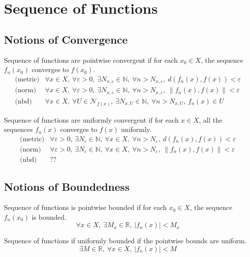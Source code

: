 \section{Sequence of Functions}
\subsection{Notions of Convergence}
\begin{definition}[pointwise]
	Sequence of functions are pointwise convergent if for each $x_0 \in X$, the sequence $f_n(x_0)$ converges to $f(x_0)$.
\begin{eqnarray}
	\text{(metric)} & \forall x \in X,\ \forall \varepsilon > 0,\ \exists N_{x,\varepsilon} \in \mathbb{N},\ \forall n > N_{x,\varepsilon},\ d(f_n(x),f(x)) < \varepsilon \\
	\text{(norm)} & \forall x \in X,\ \forall \varepsilon > 0,\ \exists N_{x,\varepsilon} \in \mathbb{N},\ \forall n > N_{x,\varepsilon},\  \|f_n(x),f(x)\| < \varepsilon\\
	\text{(nbd)} & \forall x \in X,\ \forall U \in \mathcal{N}_{f(x)},\ \exists N_{x,U} \in \mathbb{N},\ \forall n > N_{x,U},\  f_n(x) \in U
\end{eqnarray}
\end{definition}

\begin{definition}[uniform]
	Sequence of functions are uniformly convergent  if for each $x \in X$, all the sequences $f_n(x)$ converges to $f(x)$ uniformly.
\begin{eqnarray}
	\text{(metric)} & \forall \varepsilon > 0,\ \exists N_{\varepsilon} \in \mathbb{N},\ \forall x \in X,\ \forall n > N_{\varepsilon},\ d(f_n(x),f(x)) < \varepsilon \\
	\text{(norm)} & \forall \varepsilon > 0,\ \exists N_{\varepsilon} \in \mathbb{N},\ \forall x \in X,\ \forall n > N_{\varepsilon},\ \| f_n(x),f(x) \| < \varepsilon \\
	\text{(nbd)} &  ??
\end{eqnarray}
\end{definition}

\subsection{Notions of Boundedness }
\begin{definition}[pointwise]
	Sequence of functions is pointwise bounded if for each $x_0 \in X$, the sequence $f_n(x_0)$ is bounded.
\begin{equation}
	\forall x \in X,\ \exists M_x \in \mathbb{R},\ |f_n(x)| < M_x
\end{equation}
\end{definition}

\begin{definition}[uniform]
	Sequence of functions if uniformly bounded if the pointwise bounds are uniform.
\begin{equation}
	\exists M \in \mathbb{R},\ \forall x \in X,\ |f_n(x)| < M
\end{equation}
\end{definition}

